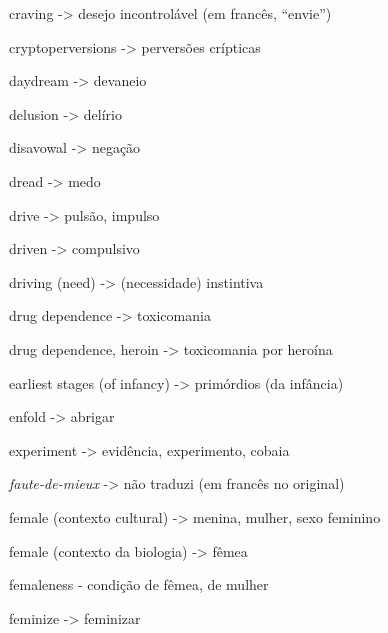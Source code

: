 \smallskip

\noindent craving -> desejo incontrolável (em francês, ``envie'')

\smallskip

\noindent cryptoperversions -> perversões crípticas 

\smallskip

\noindent daydream -> devaneio

\smallskip

\noindent delusion -> delírio

\smallskip

\noindent disavowal -> negação

\smallskip

\noindent dread -> medo

\smallskip

\noindent drive -> pulsão, impulso

\smallskip

\noindent driven -> compulsivo

\smallskip

\noindent driving (need) -> (necessidade)  instintiva

\smallskip

\noindent drug dependence -> toxicomania

\smallskip

\noindent drug dependence, heroin -> toxicomania por heroína

\smallskip

\noindent earliest stages (of infancy) -> primórdios (da infância)

\smallskip

\noindent enfold -> abrigar

\smallskip

\noindent experiment -> evidência, experimento, cobaia 

\smallskip

\noindent \textit{faute-de-mieux} -> não traduzi (em francês no original)

\smallskip

\noindent female (contexto cultural) -> menina, mulher, sexo feminino

\smallskip

\noindent female (contexto da biologia) -> fêmea

\smallskip

\noindent femaleness - condição de fêmea, de mulher

\smallskip

\noindent feminize -> feminizar

